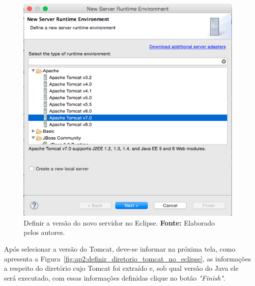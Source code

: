 \captionsetup[figure]{list=no}
\begin{figure}[h!]
	\centerline{\includegraphics[scale=0.4]{./imagens/apendices/criar-configuracao-tomcat-no-eclipse.png}}
	\caption[Definir a versão do novo servidor no Eclipse.]
	{Definir a versão do novo servidor no Eclipse. \textbf{Fonte:} Elaborado pelos autores.}
	\label{fig:ap2:selecioanr_versao_server_adicionar_eclipse}
\end{figure}

Após selecionar a versão do Tomcat, deve-se informar na próxima tela, como apresenta a Figura~\ref{fig:ap2:definir_diretorio_tomcat_no_eclipse}, as informações a respeito do diretório cujo Tomcat foi extraído e, sob qual versão do Java ele será executado, com essas informações definidas clique no botão \textit{"Finish"}.


